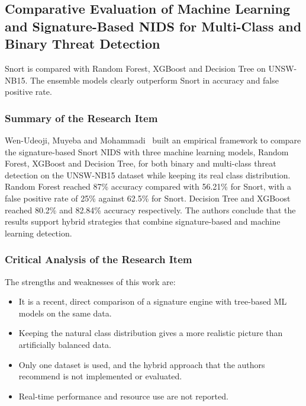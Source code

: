 \subsection{Comparative Evaluation of Machine Learning and Signature-Based NIDS for Multi-Class and Binary Threat Detection}\label{sec:3.2.5}

\noindent Snort is compared with Random Forest, XGBoost and Decision Tree on UNSW-NB15. The ensemble models clearly outperform Snort in accuracy and false positive rate.

\subsubsection{Summary of the Research Item}\label{sec:3.2.5.1}

\noindent Wen-Udeoji, Muyeba and Mohammadi~\cite{lr:wenudeoji2025} built an empirical framework to compare the signature-based Snort NIDS with three machine learning models, Random Forest, XGBoost and Decision Tree, for both binary and multi-class threat detection on the UNSW-NB15 dataset while keeping its real class distribution. Random Forest reached 87\% accuracy compared with 56.21\% for Snort, with a false positive rate of 25\% against 62.5\% for Snort. Decision Tree and XGBoost reached 80.2\% and 82.84\% accuracy respectively. The authors conclude that the results support hybrid strategies that combine signature-based and machine learning detection.

\subsubsection{Critical Analysis of the Research Item}\label{sec:3.2.5.2}

\noindent The strengths and weaknesses of this work are:

\begin{itemize}
\item It is a recent, direct comparison of a signature engine with tree-based ML models on the same data.
\item Keeping the natural class distribution gives a more realistic picture than artificially balanced data.
\item Only one dataset is used, and the hybrid approach that the authors recommend is not implemented or evaluated.
\item Real-time performance and resource use are not reported.
\end{itemize}

